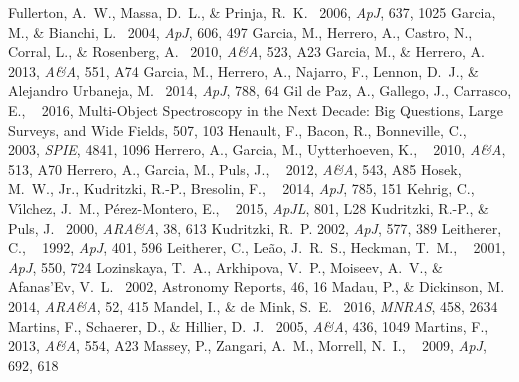 \documentclass{iau}
\begin{document}
\begin{thebibliography}{}
   {Fullerton, A.~W., Massa, D.~L., \& Prinja, R.~K.\ } 2006, \textit{ApJ}, 637, 1025
    {Garcia, M., \& Bianchi, L.\ } 2004, \textit{ApJ}, 606, 497 
      {Garcia, M., Herrero, A., Castro, N., Corral, L., \& Rosenberg, A.\ } 2010, \textit{A\&A}, 523, A23
   {Garcia, M., \& Herrero, A.\ } 2013, \textit{A\&A}, 551, A74 
      {Garcia, M., Herrero, A., Najarro, F., Lennon, D.~J., \& Alejandro Urbaneja, M.\ } 2014, \textit{ApJ}, 788, 64 
 {Gil de Paz, A., Gallego, J., Carrasco, E., \etal\ } 2016, Multi-Object Spectroscopy in the Next Decade: Big Questions, Large Surveys, and Wide Fields, 507, 103
      {Henault, F., Bacon, R., Bonneville, C., \etal\ } 2003, \textit{SPIE}, 4841, 1096     {Herrero, A., Garcia, M., Uytterhoeven, K., \etal\ } 2010, \textit{A\&A}, 513, A70 
     {Herrero, A., Garcia, M., Puls, J., \etal\ } 2012, \textit{A\&A}, 543, A85 
       {Hosek, M.~W., Jr., Kudritzki, R.-P., Bresolin, F., \etal\ } 2014, \textit{ApJ}, 785, 151 
     {Kehrig, C., V{\'{\i}}lchez, J.~M., P{\'e}rez-Montero, E., \etal\ } 2015, \textit{ApJL}, 801, L28
    {Kudritzki, R.-P., \& Puls, J.\ } 2000, \textit{ARA\&A}, 38, 613 
            {Kudritzki, R.~P.} 2002, \textit{ApJ}, 577, 389 
   {Leitherer, C., \etal\ } 1992, \textit{ApJ}, 401, 596 
   {Leitherer, C., Le{\~a}o, J.~R.~S., Heckman, T.~M., \etal\ } 2001, \textit{ApJ}, 550, 724
  {Lozinskaya, T.~A., Arkhipova, V.~P., Moiseev, A.~V., \& Afanas'Ev, V.~L.\ } 2002, Astronomy Reports, 46, 16 
   {Madau, P., \& Dickinson, M.\ } 2014, \textit{ARA\&A}, 52, 415
    {Mandel, I., \& de Mink, S.~E.\ } 2016, \textit{MNRAS}, 458, 2634
     {Martins, F., Schaerer, D., \& Hillier, D.~J.\ } 2005, \textit{A\&A}, 436, 1049 
    {Martins, F., \etal\ } 2013, \textit{A\&A}, 554, A23
     {Massey, P., Zangari, A.~M., Morrell, N.~I., \etal\ } 2009, \textit{ApJ}, 692, 618

\end{thebibliography}
\end{document}
